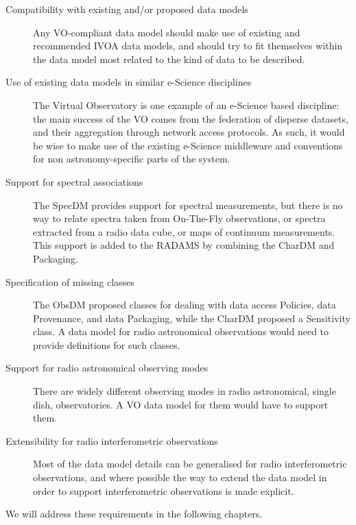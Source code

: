 		\begin{description}
			\item[Compatibility with existing and/or proposed data
			models] Any VO-com\-pli\-ant da\-ta mo\-del should make
			use of existing and recommended IVOA data models, and
			should try to fit themselves within the data model most
			related to the kind of data to be described.
			
			\item[Use of existing data models in similar
			e-Science disciplines] The Vir\-tual Observatory is
			one example of an e-Science based discipline: the
			main success of the VO comes from the federation of
			disperse datasets, and their aggregation through
			network access protocols. As such,
			it would be wise to make use of the existing e-Science
			middleware and conventions for non astronomy-specific
			parts of the system.
			
			\item[Support for spectral associations] 
			The SpecDM provides support for spectral measurements,
			but there is no way to relate spectra taken from
			On-The-Fly observations, or spectra extracted from a
			radio data cube, or maps of continuum measurements.
			This support is added to the RADAMS by combining
			the CharDM and Packaging.
			
			\item[Specification of missing classes] 
			The ObsDM proposed classes for dealing with data
			access Policies, data Provenance, and data Packaging, 
			while the CharDM proposed a Sensitivity class. A
			data model for radio astronomical observations would
			need to provide definitions for such classes.
			
			\item[Support for radio astronomical observing modes]
			There are widely different observing modes in radio
			astronomical, single dish, observatories. A VO data
			model for them would have to support them.
			
			\item[Extensibility for radio interferometric
			observations] Most of the data model details can be
			generalised for radio interferometric observations,
			and where possible the way to extend the data model
			in order to support interferometric observations is
			made explicit.
		\end{description}
		
		We will address these requirements in the following chapters.
		
